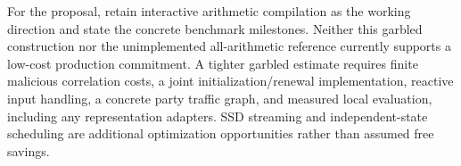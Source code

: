 For the proposal, retain interactive arithmetic compilation as the working
direction and state the concrete benchmark milestones. Neither this garbled
construction nor the unimplemented all-arithmetic reference currently supports
a low-cost production commitment. A tighter garbled estimate requires finite
malicious correlation costs, a joint initialization/renewal implementation,
reactive input handling, a concrete party traffic graph, and measured local
evaluation, including any representation adapters. SSD streaming and independent-state scheduling are additional
optimization opportunities rather than assumed free savings.

